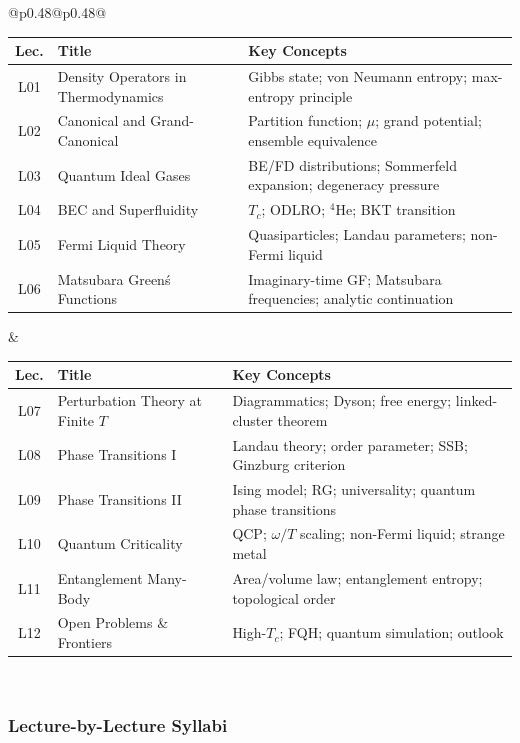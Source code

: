 \documentclass[11pt,a4paper]{article}
\begin{document}
\begin{center}
\begin{tabular}{@{}p{}@{\textwidth}p{}@{}}
\begin{tabular}[t]{@{}clp{4.5cm}@{}}
\toprule
\textbf{Lec.} & \textbf{Title} & \textbf{Key Concepts}\\
\midrule
L01 & Density Operators in Thermodynamics & Gibbs state; von Neumann entropy; max-entropy principle\\
L02 & Canonical and Grand-Canonical & Partition function; $\mu$; grand potential; ensemble equivalence\\
L03 & Quantum Ideal Gases & BE/FD distributions; Sommerfeld expansion; degeneracy pressure\\
L04 & BEC and Superfluidity & $T_c$; ODLRO; $^4$He; BKT transition\\
L05 & Fermi Liquid Theory & Quasiparticles; Landau parameters; non-Fermi liquid\\
L06 & Matsubara Green\'s Functions & Imaginary-time GF; Matsubara frequencies; analytic continuation\\
\bottomrule
\end{tabular}
&
\begin{tabular}[t]{@{}clp{4.5cm}@{}}
\toprule
\textbf{Lec.} & \textbf{Title} & \textbf{Key Concepts}\\
\midrule
L07 & Perturbation Theory at Finite $T$ & Diagrammatics; Dyson; free energy; linked-cluster theorem\\
L08 & Phase Transitions I & Landau theory; order parameter; SSB; Ginzburg criterion\\
L09 & Phase Transitions II & Ising model; RG; universality; quantum phase transitions\\
L10 & Quantum Criticality & QCP; $\omega/T$ scaling; non-Fermi liquid; strange metal\\
L11 & Entanglement Many-Body & Area/volume law; entanglement entropy; topological order\\
L12 & Open Problems \& Frontiers & High-$T_c$; FQH; quantum simulation; outlook\\
\bottomrule
\end{tabular}
\\
\end{tabular}
\end{center}

\subsubsection*{Lecture-by-Lecture Syllabi}
\end{document}
